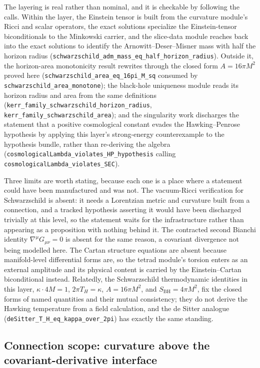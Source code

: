 \documentclass[11pt]{article}
\begin{document}
The layering is real rather than nominal, and it is checkable by
following the calls. Within the layer, the Einstein tensor is
built from the curvature module's Ricci and scalar operators, the
exact solutions specialize the Einstein-tensor biconditionals to the
Minkowski carrier, and the slice-data module reaches back into the
exact solutions to identify the Arnowitt--Deser--Misner mass with
half the horizon radius
(\texttt{schwarzschild\_adm\_mass\_eq\_half\_horizon\_radius}).
Outside it, the horizon-area monotonicity result rewrites through
the closed form $A = 16\pi M^2$ proved here
(\texttt{schwarzschild\_area\_eq\_16pi\_M\_sq} consumed by
\texttt{schwarzschild\_area\_monotone}); the black-hole uniqueness
module reads its horizon radius and area from the same definitions
(\texttt{kerr\_family\_schwarzschild\_horizon\_radius},
\texttt{kerr\_family\_schwarzschild\_area}); and the singularity
work discharges the statement that a positive cosmological constant
evades the Hawking--Penrose hypothesis by applying this layer's
strong-energy counterexample to the hypothesis bundle, rather than
re-deriving the algebra
(\texttt{cosmologicalLambda\_violates\_HP\_hypothesis} calling
\texttt{cosmologicalLambda\_violates\_SEC}).

Three limits are worth stating, because each one is a place where a
statement could have been manufactured and was not. The vacuum-Ricci
verification for Schwarzschild is absent: it needs a Lorentzian
metric and curvature built from a connection, and a tracked
hypothesis asserting it would have been discharged trivially at this
level, so the statement waits for the infrastructure rather than
appearing as a proposition with nothing behind it. The contracted
second Bianchi identity $\nabla^\mu G_{\mu\nu} = 0$ is absent for the
same reason, a covariant divergence not being modelled here. The
Cartan structure equations are absent because manifold-level
differential forms are, so the tetrad module's torsion enters as an
external amplitude and its physical content is carried by the
Einstein--Cartan biconditional instead. Relatedly, the Schwarzschild
thermodynamic identities in this layer, $\kappa \cdot 4M = 1$, $2\pi
T_H = \kappa$, $A = 16\pi M^2$, and $S_{\mathrm{BH}} = 4\pi M^2$,
fix the closed forms of named quantities and their mutual
consistency; they do not derive the Hawking temperature from a field
calculation, and the de Sitter analogue
(\texttt{deSitter\_T\_H\_eq\_kappa\_over\_2pi}) has exactly the same
standing.

\subsection{Connection scope: curvature above the covariant-derivative interface}
\label{sec:riemannian_sidebar}
\end{document}
